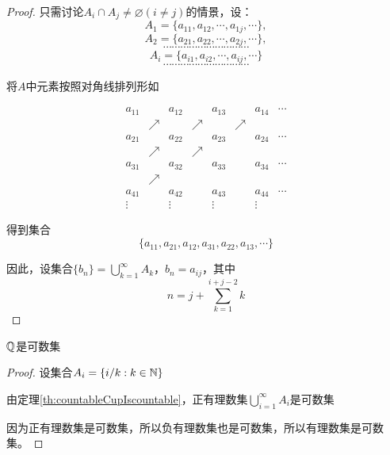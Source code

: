 \begin{proof}
    只需讨论$A_i\cap A_j \neq \varnothing(i\neq j)$的情景，设：
    \begin{equation*}
        A_1=\{a_{11},a_{12},\cdots,a_{1j},\cdots\},
    \end{equation*}
    \begin{equation*}
        A_2=\{a_{21},a_{22},\cdots,a_{2j},\cdots\}, 
    \end{equation*}
    \begin{equation*}
        \cdots \cdots \cdots \cdots \cdots \cdots \cdots \cdots \cdots \cdots
    \end{equation*}
    \begin{equation*}
        A_i=\{a_{i1},a_{i2},\cdots,a_{ij},\cdots\}
    \end{equation*}
    \begin{equation*}
        \cdots \cdots \cdots \cdots \cdots \cdots \cdots \cdots \cdots \cdots
    \end{equation*}

    将$A$中元素按照对角线排列形如

    \begin{equation*}
        \begin{matrix}
            a_{11} &\ & a_{12} &\  &a_{13} &\ &a_{14}& \cdots \\
            \  & \nearrow & \ &\nearrow &\ &\nearrow \\
            a_{21} &\ &a_{22}&\ &a_{23}&\ &a_{24} &\cdots \\
            \ & \nearrow &\ &\nearrow \\
            a_{31}&\ &a_{32}&\ &a_{33}&\ &a_{34} &\cdots \\
            \  &\nearrow &\ \\
            a_{41}&\ &a_{42}&\ &a_{43} &\ &a_{44}&\cdots \\
            \vdots &\ &\vdots&\ &\vdots&\ &\vdots
        \end{matrix}
    \end{equation*}

    得到集合
    \[\{a_{11},a_{21},a_{12},a_{31},a_{22},a_{13},\cdots\}\]

    因此，设集合$\{b_n\} =\bigcup_{k=1}^{\infty} A_k$，$b_n = a_{ij}$，其中
    \[n=j+\sum_{k=1}^{i+j-2}k \]

    \qde
\end{proof}

\begin{proposition}
    $\mathbb{Q}$是可数集
\end{proposition}
\begin{proof}
    设集合$A_i=\{i/k :k\in\mathbb{N}\}$

    由定理\ref{th:countableCupIscountable}，正有理数集$\bigcup_{i=1}^{\infty}A_i$是可数集

    因为正有理数集是可数集，所以负有理数集也是可数集，所以有理数集是可数集。

    \qde
\end{proof}

